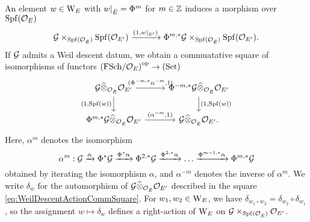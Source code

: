 \documentclass[../main.tex]{subfiles}
\begin{document}
An element $w \in \mathrm W_E$ with $w|_{{\breve {E}}} = \Phi^m$ for $m \in \mathbb{Z}$ induces
a morphism over $\operatorname{Spf}(\mathcal{O}_E)$
\begin{equation*}
  \mathcal{G} \times_{\operatorname{Spf}({\mathcal{O}_{{\breve {E}}}})} \operatorname{Spf}(\mathcal{O}_{{E'}}) \xrightarrow{(1,w|_{E'})}
  \Phi^{m, *}\mathcal{G} \times_{\operatorname{Spf}({\mathcal{O}_{{\breve {E}}}})} \operatorname{Spf}(\mathcal{O}_{{E'}}).
\end{equation*}
If $\mathcal{G}$ admits a Weil descent datum, we obtain a commuatative square 
of isomorphisms of functors ${(\mathrm{FSch}/{\mathcal{O}_E})}^{{\mathrm{op}}} \to {(\mathrm{Set})}$ 
\begin{equation}\label{eq:WeilDescentActionCommSquare}
\begin{tikzcd}[ampersand replacement=\&]
	{\cG \cotimes_{\cO_\br E} \cO_{{E'}}} \& {\Phi^{-m, *}\cG \cotimes_{\cO_\br E} \cO_{E'}} \\
	{\Phi^{m, *}\cG \cotimes_{\cO_\br E} \cO_{{E'}}} \& {\cG \cotimes_{\cO_\br E} \cO_{E'}}.
	\arrow["{(\Phi^{-m, *} \alpha^{-m}, 1)}", from=1-1, to=1-2]
	\arrow["{(1, \spf(w))}"', from=1-1, to=2-1]
	\arrow["{(1,\spf(w))}", from=1-2, to=2-2]
	\arrow["{(\alpha^{-m}, 1)}", from=2-1, to=2-2]
\end{tikzcd}
\end{equation}
Here, $\alpha^{m}$ denotes the isomorphism 
$$\alpha^m: \mathcal{G} \xrightarrow{\alpha} \Phi^{*} \mathcal{G} \xrightarrow{\Phi^* \alpha} \Phi^{2, *}\mathcal{G}
\xrightarrow{\Phi^{2,*}\alpha} \dots \xrightarrow{\Phi^{m-1,*}\alpha} \Phi^{m,*}\mathcal{G}$$ 
obtained by iterating the isomorphism $\alpha$, and 
$\alpha^{-m}$ denotes the inverse of $\alpha^{m}$. 
We write $\delta_w$ for the automorphism of $\mathcal{G} \widehat \otimes_{\mathcal{O}_{\breve {E}}} \mathcal{O}_{{E'}}$
described in the square \eqref{eq:WeilDescentActionCommSquare}.
For $w_1, w_2 \in \mathrm W_E$, we have $\delta_{w_1 \circ w_2} = \delta_{w_2}
\circ \delta_{w_1}$,
so the assignment $w \mapsto \delta_{w}$ defines a right-action of 
$\mathrm W_E$ on $\mathcal{G} \times_{\operatorname{Spf}(\mathcal{O}_{{\breve {E}}})} \mathcal{O}_{{E'}}$. 
\end{document}
